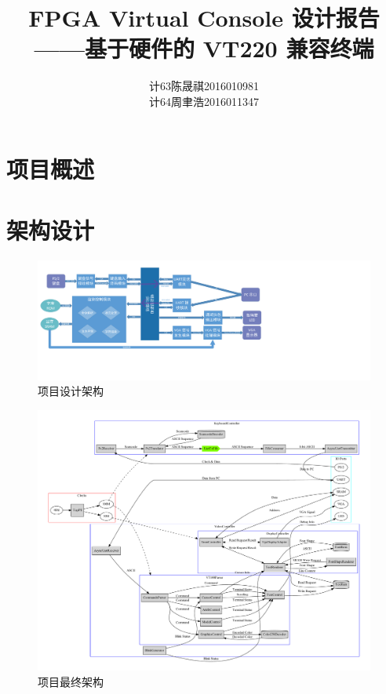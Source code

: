 \documentclass{ctexart}
\newcommand{\arttitle}{FPGA Virtual Console 设计报告}
\newcommand{\artsubject}{基于硬件的 VT220 兼容终端}
\begin{document}
\title{{\bf\arttitle\\——\artsubject}}
\author{
计63\hspace{1em}陈晟祺\hspace{1em}2016010981 \\
计64\hspace{1em}周聿浩\hspace{1em}2016011347
}
\date{}
\maketitle

\tableofcontents

\section{项目概述}

\section{架构设计}

\begin{figure}[htbp]
\centerline{
\includegraphics[width=0.95\paperwidth]{architecture_design_visio.pdf}
}
\label{fig:design_architecture}
\caption{项目设计架构}
\end{figure}

\begin{figure}[htbp]
\centerline{
\includegraphics[width=\paperwidth]{architecture_final_dot.pdf}
}
\label{fig:final_architecture}
\caption{项目最终架构}
\end{figure}
\end{document}
